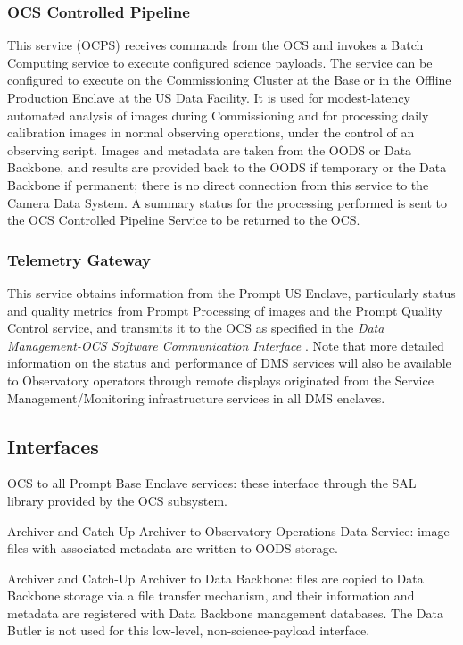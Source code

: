 \documentclass[DM,toc,lsstdraft]{lsstdoc}
\begin{document}
\subsubsection{OCS Controlled Pipeline}\label{ocs-controlled-pipeline}

This service (OCPS) receives commands from the OCS and invokes a Batch Computing service to execute configured science payloads.
The service can be configured to execute on the Commissioning Cluster at the Base or in the Offline Production Enclave at the US Data Facility.
It is used for modest-latency automated analysis of images during Commissioning and for processing daily calibration images in normal observing operations, under the control of an observing script.
Images and metadata are taken from the OODS or Data Backbone, and results are provided back to the OODS if temporary or the Data Backbone if permanent; there is no direct connection from this service to the Camera Data System.
A summary status for the processing performed is sent to the OCS Controlled Pipeline Service to be returned to the OCS.

\subsubsection{Telemetry Gateway}\label{telemetry-gateway}

This service obtains information from the Prompt US Enclave,
particularly status and quality metrics from Prompt Processing of images
and the Prompt Quality Control service, and transmits it to the OCS as
specified in the \textit{Data Management-OCS Software Communication Interface}
. Note that more detailed information on the status and
performance of DMS services will also be available to Observatory
operators through remote displays originated from the
Service Management/Monitoring infrastructure services in all DMS enclaves.

\subsection{Interfaces}\label{base-interfaces}

OCS to all Prompt Base Enclave services: these interface through the SAL
library provided by the OCS subsystem.

Archiver and Catch-Up Archiver to Observatory Operations Data Service:
image files with associated metadata are written to OODS storage.

Archiver and Catch-Up Archiver to Data Backbone: files are copied to
Data Backbone storage via a file transfer mechanism, and their
information and metadata are registered with Data Backbone management
databases. The Data Butler is not used for this low-level,
non-science-payload interface.
\end{document}
